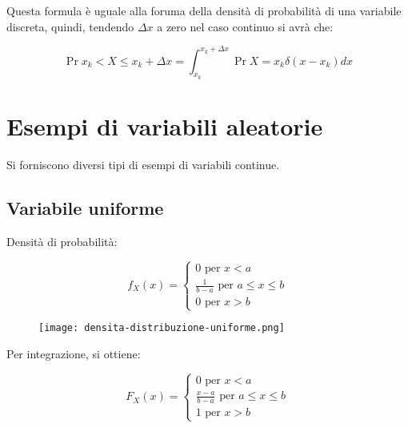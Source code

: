 Questa formula è uguale alla foruma della densità di probabilità di una variabile discreta, quindi, tendendo $\Delta x$ a zero nel caso continuo si avrà che:

{
    \Large 
    \begin{equation}
        \Pr{x_k < X \leq x_k + \Delta x} 
        = 
        \int_{x_k}^{x_k + \Delta x} 
        \Pr{X = x_k}
        \delta (x - x_k)
        dx 
    \end{equation}
}

\newpage 

\section{Esempi di variabili aleatorie}

Si forniscono diversi tipi di esempi di variabili continue. \newline 

\subsection{Variabile uniforme} 

Densità di probabilità: 

{
    \Large 
    \begin{equation}
        f_X (x) 
        = 
        \begin{cases}
            0 
            \text{ per }
            x<a 
            \\
            \frac{1}{b - a} 
            \text{ per } 
            a \leq x \leq b 
            \\ 
            0 
            \text{ per } 
            x>b
        \end{cases}
    \end{equation}
}

\begin{figure}[h]
    \centering
    \texttt{[image: densita-distribuzione-uniforme.png]}
\end{figure} 

Per integrazione, si ottiene: 

{
    \Large 
    \begin{equation}
        F_X (x) 
        = 
        \begin{cases}
            0 
            \text{ per }
            x<a 
            \\
            \frac{x-a}{b - a} 
            \text{ per } 
            a \leq x \leq b 
            \\ 
            1 
            \text{ per } 
            x>b
        \end{cases}
    \end{equation}
}


